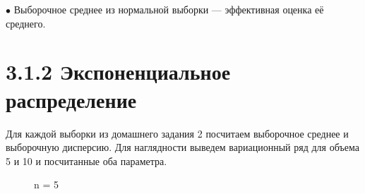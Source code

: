 \documentclass[a4paper,12pt, oneside]{book}
\begin{document}
\vspace{5mm}
{\sf$\bullet$ Выборочное среднее из нормальной выборки — эффективная оценка её среднего.}
\vspace{5mm}


\vspace{5mm}
\section{3.1.2 Экспоненциальное распределение}
\vspace{5mm}


Для каждой выборки из домашнего задания 2 посчитаем выборочное среднее и выборочную дисперсию. Для наглядности выведем вариационный ряд  для объема 5 и 10 и посчитанные оба параметра.

\begin{figure}[h!]
	\begin{center}
		\begin{minipage}[h]{0.47\linewidth}
			 n = 5 \\

\end{minipage}
\end{center}
\end{figure}
\end{document}
